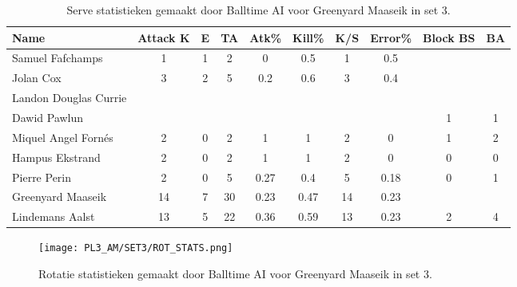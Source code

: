 \begin{table}[ht!]
  \centering
  \scriptsize
  \begin{tabular}{|l|c|c|c|c|c|c|c|c|c|} \hline
    \textbf{Name} & Attack K & E & TA & Atk\% & Kill\% & K/S & Error\% & Block BS & BA \\ \hline
    Samuel Fafchamps & 1 & 1 & 2 & 0 & 0.5 & 1 & 0.5 &   &   \\
    Jolan Cox & 3 & 2 & 5 & 0.2 & 0.6 & 3 & 0.4 &   &   \\
    Landon Douglas Currie &   &   &   &   &   &   &   &   &   \\
    Dawid Pawlun &   &   &   &   &   &   &   & 1 & 1 \\
    Miquel Angel Fornés & 2 & 0 & 2 & 1 & 1 & 2 & 0 & 1 & 2 \\
    Hampus Ekstrand & 2 & 0 & 2 & 1 & 1 & 2 & 0 & 0 & 0 \\
    Pierre Perin & 2 & 0 & 5 & 0.27 & 0.4 & 5 & 0.18 & 0 & 1 \\
    Greenyard Maaseik & 14 & 7 & 30 & 0.23 & 0.47 & 14 & 0.23 &   &   \\
    Lindemans Aalst & 13 & 5 & 22 & 0.36 & 0.59 & 13 & 0.23 & 2 & 4 \\ \hline
  \end{tabular}
  \caption[Attacking en blocking statistieken gemaakt door Balltime AI voor Greenyard Maaseik in set 3]{\label{tab:PL3AttBlockGreenyard3}Serve statistieken gemaakt door Balltime AI voor Greenyard Maaseik in set 3.}
\end{table}

\begin{figure}
  \centering
  \texttt{[image: PL3\_AM/SET3/ROT\_STATS.png]}
  \caption{\label{fig:PL3_ROT_STATS_3}Rotatie statistieken gemaakt door Balltime AI voor Greenyard Maaseik in set 3.}
\end{figure}